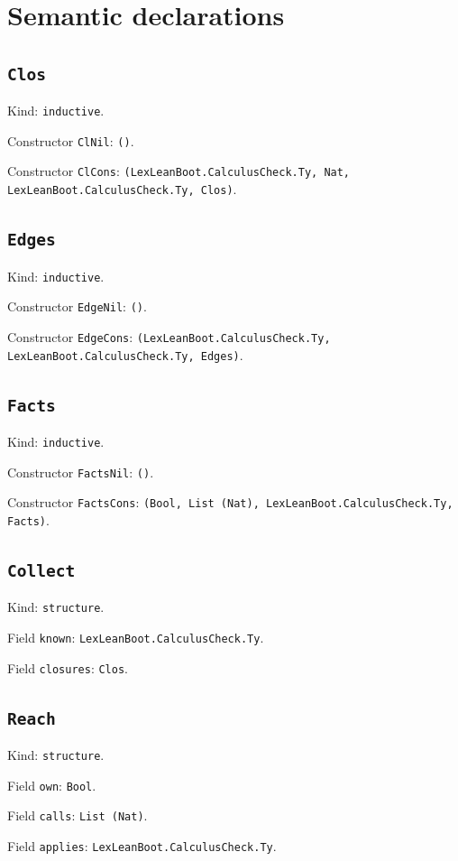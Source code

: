 \documentclass[11pt]{article}
\begin{document}
\section*{Semantic declarations}
\subsection*{\texttt{Clos}}
\noindent Kind: \texttt{inductive}.\par
\noindent Constructor \texttt{ClNil}: \texttt{()}.\par
\noindent Constructor \texttt{ClCons}: \texttt{(LexLeanBoot.CalculusCheck.Ty, Nat, LexLeanBoot.CalculusCheck.Ty, Clos)}.\par
\subsection*{\texttt{Edges}}
\noindent Kind: \texttt{inductive}.\par
\noindent Constructor \texttt{EdgeNil}: \texttt{()}.\par
\noindent Constructor \texttt{EdgeCons}: \texttt{(LexLeanBoot.CalculusCheck.Ty, LexLeanBoot.CalculusCheck.Ty, Edges)}.\par
\subsection*{\texttt{Facts}}
\noindent Kind: \texttt{inductive}.\par
\noindent Constructor \texttt{FactsNil}: \texttt{()}.\par
\noindent Constructor \texttt{FactsCons}: \texttt{(Bool, List (Nat), LexLeanBoot.CalculusCheck.Ty, Facts)}.\par
\subsection*{\texttt{Collect}}
\noindent Kind: \texttt{structure}.\par
\noindent Field \texttt{known}: \texttt{LexLeanBoot.CalculusCheck.Ty}.\par
\noindent Field \texttt{closures}: \texttt{Clos}.\par
\subsection*{\texttt{Reach}}
\noindent Kind: \texttt{structure}.\par
\noindent Field \texttt{own}: \texttt{Bool}.\par
\noindent Field \texttt{calls}: \texttt{List (Nat)}.\par
\noindent Field \texttt{applies}: \texttt{LexLeanBoot.CalculusCheck.Ty}.\par
\end{document}
